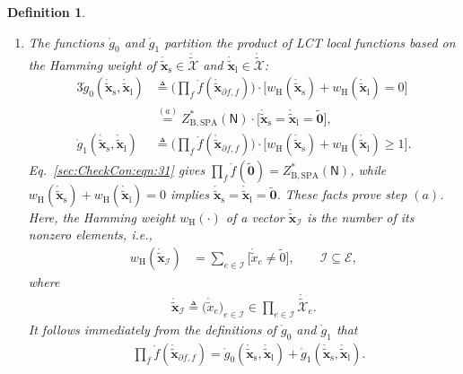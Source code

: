 \documentclass[journal]{IEEEtran}
\newcommand{\add}[1]{{\color{black}#1}}
\newtheorem{definition}[theorem]{Definition}
\newcommand{\vect}[1]{ \bm{#1} }
\newcommand{\set}[1]{\mathcal{#1}}
\newcommand{\setEfull}{ \mathcal{E} }
\newcommand{\setpf}{ \partial f }
\newcommand{\wh}{w_{\mathrm{H}}}
\newcommand{\graphN}{ \mathsf{N} }
\newcommand{\defeq}{ \triangleq }
\newcommand{\ZBSPA}{ Z_{\mathrm{B,SPA}} }
\newcommand{\LCTtset}[1]{\mathring{\tilde{\mathcal{#1}}}}
\newcommand{\LCTtv}[1]{ \mathring{ \tilde{ \vect{#1} } } }
\newcommand{\LCT}[1]{ \mathring{#1} }
\newcommand{\LCTt}[1]{ \mathring{ \tilde{#1} } }
\newcommand{\LCTvxl}{ \LCTtv{x}_{\mathrm{l}} }
\newcommand{\LCTvxs}{ \LCTtv{x}_{\mathrm{s}} }
\newcommand*{\ie}{\textit{i.e.}}
\newcommand{\gzero}{\LCT{g}_{0}}
\newcommand{\gone}{\LCT{g}_{1}}
\newcommand{\tv}[1]{ \tilde{\vect{#1}} }
\begin{document}
\begin{appendices}
\begin{definition}
\begin{enumerate}
      \item The functions $ \gzero $ and $ \gone $ partition the product
            of LCT local functions based on the Hamming weight of
            $ \LCTvxs \in \LCTtset{X} $ and $ \LCTvxl \in \LCTtset{X} $:
            \begin{alignat}{3}
              \gzero
              (\LCTvxs, \LCTvxl)
                                      & \defeq
              \Biggl( \prod_{f}\LCT{f}( \LCTtv{x}_{\setpf,f}) \Biggr)
              \cdot
              \bigl[ \wh(\LCTvxs) + \wh( \LCTvxl) \!=\! 0 \bigr]
              \nonumber
              \\&\overset{(a)}{=} \ZBSPA^{*}(\graphN)
              \cdot \bigl[ \LCTvxs\!=\!\LCTvxl \!=\! \tv{0} \bigr],
              \label{sec:CheckCon:eqn:60}      \\
              \gone(\LCTvxs, \LCTvxl) & \defeq
              \Biggl( \prod_{f}\LCT{f}( \LCTtv{x}_{\setpf,f}) \Biggr) \cdot
              \bigl[ \wh(\LCTvxs) + \wh( \LCTvxl) \!\geq\! 1 \bigr]. \nonumber
            \end{alignat}
            \add{Eq.~\eqref{sec:CheckCon:eqn:31} gives
              $ \prod_{f}\LCT{f}( \tv{0} ) = \ZBSPA^{*}(\graphN) $, while
              $ \wh(\LCTvxs) + \wh( \LCTvxl) = 0 $ implies
              $ \LCTvxs = \LCTvxl = \tv{0} $. These facts prove step $(a)$.}
            Here, the Hamming weight $ \wh(\cdot) $ of a vector
            $ \LCTtv{x}_{\set{I}} $ is the number of its \add{nonzero}
            elements, \ie,
            \begin{align*}
              \wh( \LCTtv{x}_{\set{I}} )
               & =
              \sum_{ e \in \set{I} }
              \bigl[ \LCTt{x}_{e} \!\neq\! \tilde{0} \bigr],\qquad
              \set{I} \subseteq \setEfull,
            \end{align*}
            where
            \begin{align*}
              \LCTtv{x}_{\set{I}} \defeq \bigl( \LCTt{x}_{e} \bigr)_{ e \in \set{I} }
              \in \prod_{e \in \set{I}} \LCTtset{X}_{e}.
            \end{align*}
            It follows immediately from the definitions of $ \gzero $ and $ \gone $ that
            \begin{align}
               & \prod_{f}\LCT{f}( \LCTtv{x}_{\setpf,f})=
              \gzero
              (\LCTvxs, \LCTvxl)
              + \gone(\LCTvxs, \LCTvxl). \label{eqn: property of g0 g1}
            \end{align}
    \end{enumerate}

\end{definition}
\end{appendices}
\end{document}
